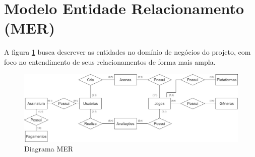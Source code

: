 \clearpage
\section{Modelo Entidade Relacionamento (MER)}
A figura \ref{DiagramaMer} busca descrever as entidades no domínio de negócios do projeto, com foco no entendimento de seus relacionamentos de forma mais ampla.


\begin{figure}
    \centering
    \caption{Diagrama MER}
    \label{DiagramaMer}
    \includegraphics[scale=0.60]{imagens/arquitetura/diagrama-mer-new.jpg}
\end{figure}